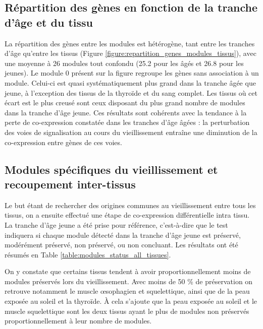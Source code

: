 \subsection{Répartition des gènes en fonction de la tranche d'âge et du tissu}

La répartition des gènes entre les modules est hétérogène, tant entre les tranches d'âge qu'entre les tissus (Figure \ref{figure:repartition_genes_modules_tissus}), avec une moyenne à 26 modules tout confondu (25.2 pour les âgés et 26.8 pour les jeunes). Le module 0 présent sur la figure regroupe les gènes sans association à un module. Celui-ci est quasi systématiquement plus grand dans la tranche âgée que jeune, à l'exception des tissus de la thyroïde et du sang complet. Les tissus où cet écart est le plus creusé sont ceux disposant du plus grand nombre de modules dans la tranche d'âge jeune. Ces résultats sont cohérents avec la tendance à la perte de co-expression constatée dans les tranches d'âge âgées  : la perturbation des voies de signalisation au cours du vieillissement entraîne une diminution de la co-expression entre gènes de ces voies.


\subsection{Modules spécifiques du vieillissement et recoupement inter-tissus}

Le but étant de rechercher des origines communes au vieillissement entre tous les tissus, on a ensuite effectué une étape de co-expression différentielle intra tissu. La tranche d'âge jeune a été prise pour référence, c’est-à-dire que le test indiquera si chaque module détecté dans la tranche d'âge jeune est préservé, modérément préservé, non préservé, ou non concluant. Les résultats ont été résumés en Table \ref{table:modules_status_all_tissues}. 

On y constate que certains tissus tendent à avoir proportionnellement moins de modules préservés lors du vieillissement. Avec moins de 50 \% de préservation on retrouve notamment le muscle œsophagien et squelettique, ainsi que de la peau exposée au soleil et la thyroïde. À cela s'ajoute que la peau exposée au soleil et le muscle squelettique sont les deux tissus ayant le plus de modules non préservés proportionnellement à leur nombre de modules.

